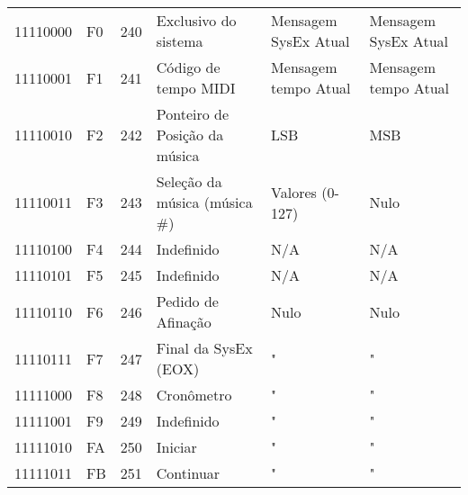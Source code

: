 \begin{center}
\begin{supertabular}{| C{2cm} | C{1.5cm} | C{1.5cm} | C{5.3cm} | C{1.5cm} | C{1.5cm} |}
             11110000 & F0 & 240 &            Exclusivo do sistema                 &       Mensagem SysEx Atual           &         Mensagem SysEx Atual         \\
                11110001 & F1 & 241 &            Código de tempo MIDI                 &       Mensagem tempo Atual           &         Mensagem tempo Atual         \\
             11110010 & F2 & 242 &        Ponteiro de Posição da música            &               LSB                    &                 MSB                  \\
                11110011 & F3 & 243 &       Seleção da música (música \#)             &          Valores (0-127)             &                 Nulo                 \\
             11110100 & F4 & 244 &                Indefinido                       &                N/A                   &                  N/A                 \\
                11110101 & F5 & 245 &                Indefinido                       &                N/A                   &                  N/A                 \\
             11110110 & F6 & 246 &            Pedido de Afinação                   &               Nulo                   &                 Nulo                 \\
                11110111 & F7 & 247 &           Final da SysEx (EOX)                  &                 "                    &                   "                  \\
             11111000 & F8 & 248 &                Cronômetro                       &                 "                    &                   "                  \\
                11111001 & F9 & 249 &                Indefinido                       &                 "                    &                   "                  \\
             11111010 & FA & 250 &                  Iniciar                        &                 "                    &                   "                  \\
                11111011 & FB & 251 &                 Continuar                       &                 "                    &                   "                  \\

\end{supertabular}
\end{center}
